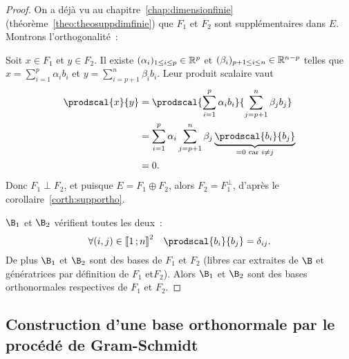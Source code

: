 \begin{proof}
  On a déjà vu au chapitre~\ref{chap:dimensionfinie} (théorème~\ref{theo:theosuppdimfinie}) que $F_1$ et $F_2$ sont supplémentaires dans $E$. Montrons l'orthogonalité~:
  
  Soit $x \in F_1$ et $y \in F_2$. Il existe $(\alpha_i)_{1 \leq i \leq p} \in \mathbb{R}^p$ et $(\beta_i)_{p+1 \leq i \leq n}\in \mathbb{R}^{n-p}$ telles que $x = \sum_{i=1}^p \alpha_i b_i$ et $y = \sum_{i=p+1}^n \beta_i b_i$. Leur produit scalaire vaut
  \begin{align}
    \prodscal{x}{y} &= \prodscal{\sum_{i=1}^p \alpha_i b_i}{\sum_{j=p+1}^n \beta_j b_j}\\
    &= \sum_{i=1}^p \alpha_i \sum_{j=p+1}^n \beta_j \underbrace{\prodscal{b_i}{b_j}}_{=0 \text{~car~} i\neq j}\\
    &=0.
  \end{align}
  Donc $F_1 \perp F_2$, et puisque $E = F_1 \oplus F_2$, alors $F_2 = F_1^\perp$, d'après le corollaire~\ref{corth:supportho}.

  $\B_1$ et $\B_2$ vérifient toutes les deux~:
  \begin{equation}
    \forall (i,j) \in \intervalleentier{1}{n}^2 \quad \prodscal{b_i}{b_j}=\delta_{ij}.
  \end{equation}
  De plus $\B_1$ et $\B_2$ sont des bases de $F_1$ et $F_2$ (libres car extraites de $\B$ et génératrices par définition de $F_1$ et$F _2$). Alors $\B_1$ et $\B_2$ sont des bases orthonormales respectives de $F_1$ et $F_2$.
\end{proof}

\subsection{Construction d'une base orthonormale par le procédé de Gram-Schmidt}

